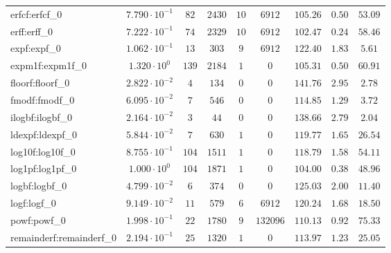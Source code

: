 \begin{tabular}{|l|c|c|c|c|c|c|c|c|}
erfcf:erfcf\_0               & $ 7.790 \cdot 10^{-1} $ & $ 82     $ & $ 2430  $ & $ 10  $ & $ 6912   $ & $ 105.26      $ & $ 0.50    $ & $ 53.09   $ \\
erff:erff\_0                 & $ 7.222 \cdot 10^{-1} $ & $ 74     $ & $ 2329  $ & $ 10  $ & $ 6912   $ & $ 102.47      $ & $ 0.24    $ & $ 58.46   $ \\
expf:expf\_0                 & $ 1.062 \cdot 10^{-1} $ & $ 13     $ & $ 303   $ & $ 9   $ & $ 6912   $ & $ 122.40      $ & $ 1.83    $ & $ 5.61    $ \\
expm1f:expm1f\_0             & $ 1.320 \cdot 10^{0}  $ & $ 139    $ & $ 2184  $ & $ 1   $ & $ 0      $ & $ 105.31      $ & $ 0.50    $ & $ 60.91   $ \\
floorf:floorf\_0             & $ 2.822 \cdot 10^{-2} $ & $ 4      $ & $ 134   $ & $ 0   $ & $ 0      $ & $ 141.76      $ & $ 2.95    $ & $ 2.78    $ \\
fmodf:fmodf\_0               & $ 6.095 \cdot 10^{-2} $ & $ 7      $ & $ 546   $ & $ 0   $ & $ 0      $ & $ 114.85      $ & $ 1.29    $ & $ 3.72    $ \\
ilogbf:ilogbf\_0             & $ 2.164 \cdot 10^{-2} $ & $ 3      $ & $ 44    $ & $ 0   $ & $ 0      $ & $ 138.66      $ & $ 2.79    $ & $ 2.04    $ \\
ldexpf:ldexpf\_0             & $ 5.844 \cdot 10^{-2} $ & $ 7      $ & $ 630   $ & $ 1   $ & $ 0      $ & $ 119.77      $ & $ 1.65    $ & $ 26.54   $ \\
log10f:log10f\_0             & $ 8.755 \cdot 10^{-1} $ & $ 104    $ & $ 1511  $ & $ 1   $ & $ 0      $ & $ 118.79      $ & $ 1.58    $ & $ 54.11   $ \\
log1pf:log1pf\_0             & $ 1.000 \cdot 10^{0}  $ & $ 104    $ & $ 1871  $ & $ 1   $ & $ 0      $ & $ 104.00      $ & $ 0.38    $ & $ 48.96   $ \\
logbf:logbf\_0               & $ 4.799 \cdot 10^{-2} $ & $ 6      $ & $ 374   $ & $ 0   $ & $ 0      $ & $ 125.03      $ & $ 2.00    $ & $ 11.40   $ \\
logf:logf\_0                 & $ 9.149 \cdot 10^{-2} $ & $ 11     $ & $ 579   $ & $ 6   $ & $ 6912   $ & $ 120.24      $ & $ 1.68    $ & $ 18.50   $ \\
powf:powf\_0                 & $ 1.998 \cdot 10^{-1} $ & $ 22     $ & $ 1780  $ & $ 9   $ & $ 132096 $ & $ 110.13      $ & $ 0.92    $ & $ 75.33   $ \\
remainderf:remainderf\_0     & $ 2.194 \cdot 10^{-1} $ & $ 25     $ & $ 1320  $ & $ 1   $ & $ 0      $ & $ 113.97      $ & $ 1.23    $ & $ 25.05   $ \\

\end{tabular}
